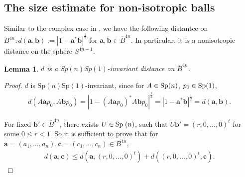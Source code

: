 \documentclass[a4paper,11pt]{amsart}
\numberwithin{equation}{section}
\newtheorem{lem}{Lemma}[section]
\begin{document}
\subsection{The size estimate for non-isotropic balls}
Similar to the complex case in \cite[Lemma 8.1.11]{Stoll}, we have the following distantce on $B^{4n}:d(\mathbf{a},\mathbf{b}):=|1-\mathbf{a}^*\mathbf{b}|^{\frac12}$ for $\mathbf{a},\mathbf{b}\in \overline{B}^{4n}$. In particular, it is a nonisotropic distance on the sphere $S^{4n-1}$.
\begin{lem}\label{distance}
$d$ is a {\rm Sp}$(n)${\rm Sp}$(1)$-invariant distance on $\overline{B}^{4n}$.
\end{lem}
\begin{proof}
 $d$ is Sp$(n)$Sp$(1)$-invariant, since for $A\in{\rm Sp}(n)$, $p_0\in{\rm Sp}(1)$,
\begin{equation}\begin{aligned}
d(A\mathbf{a}p_0,A\mathbf{b}p_0)=|1-(A\mathbf{a}p_0)^*A\mathbf{b}p_0|^{\frac12}=|1-\mathbf{a}^*\mathbf{b}|^{\frac12}=d(\mathbf{a},\mathbf{b}).
\end{aligned}\end{equation}

For fixed $\mathbf{b}'\in \overline{B}^{4n}$, there exists $U\in{\rm Sp}\;(n)$, such that $U\mathbf{b}'=(r,0,\dots,0)^t$ for some $0\leq r<1$. So it is sufficient to prove that for $\mathbf{a}=(a_1,\dots,a_n),\mathbf{c}=(c_1,\dots,c_n)\in B^{4n}$,
\begin{equation}\begin{aligned}\label{sim distance}
d(\mathbf{a},\mathbf{c})\leq  d(\mathbf{a},(r,0,\dots,0)^t)+d((r,0,\dots,0)^t,\mathbf{c}).
\end{aligned}\end{equation}


\end{proof}
\end{document}
